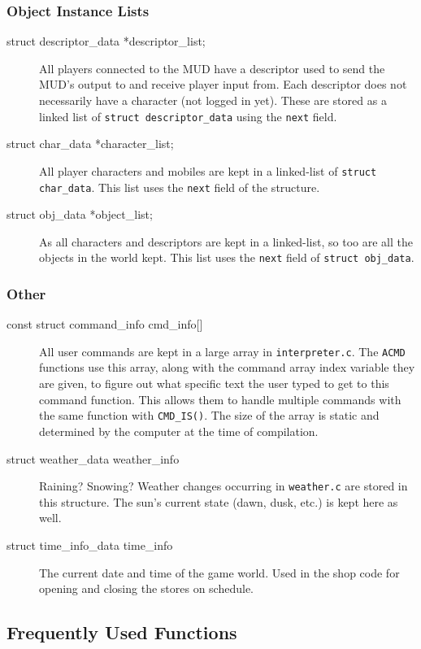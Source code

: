 \documentclass[11pt]{article}
\begin{document}
\subsubsection{Object Instance Lists}
\begin{description}
\item[struct descriptor\_data *descriptor\_list;]
All players connected to the MUD have a descriptor used to send the MUD's output to and receive player input from.  Each descriptor does not necessarily have a character (not logged in yet).  These are stored as a linked list of \texttt{struct descriptor\_data} using the \texttt{next} field.
\item[struct char\_data *character\_list;]
All player characters and mobiles are kept in a linked-list of \texttt{struct char\_data}.  This list uses the \texttt{next} field of the structure.
\item[struct obj\_data *object\_list;]
As all characters and descriptors are kept in a linked-list, so too are all the objects in the world kept.  This list uses the \texttt{next} field of \texttt{struct obj\_data}.
\end{description}

\subsubsection{Other}
\begin{description}
\item[const struct command\_info cmd\_info[{]}]
All user commands are kept in a large array in \texttt{interpreter.c}.  The \texttt{ACMD} functions use this array, along with the command array index variable they are given, to figure out what specific text the user typed to get to this command function.  This allows them to handle multiple commands with the same function with \texttt{CMD\_IS()}.  The size of the array is static and determined by the computer at the time of compilation.
\item[struct weather\_data weather\_info]
Raining? Snowing? Weather changes occurring in \texttt{weather.c} are stored in this structure.  The sun's current state (dawn, dusk, etc.) is kept here as well.
\item[struct time\_info\_data time\_info]
The current date and time of the game world.  Used in the shop code for opening and closing the stores on schedule.
\end{description}

\subsection{Frequently Used Functions}
\end{document}

